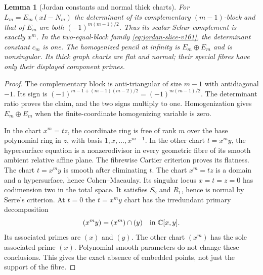 \documentclass[11pt,reqno]{amsart}
\numberwithin{equation}{section}
\newtheorem{lemma}[theorem]{Lemma}
\theoremstyle{definition}\newtheorem{definition}[theorem]{Definition}
\theoremstyle{remark}\newtheorem{remark}[theorem]{Remark}
\newcommand{\C}{\mathbb C}\newcommand{\Q}{\mathbb Q}
\begin{document}
\begin{lemma}[Jordan constants and normal thick charts]
\label{lem:Jordan-details-v162}
For $L_m=E_m(xI-N_m)$ the determinant of its complementary
$(m-1)$-block and that of $E_m$ are both
$(-1)^{m(m-1)/2}$. Thus its scalar Schur complement is exactly
$x^m$. In the two-equal-block family
\eqref{eq:jordan-slice-v161}, the determinant constant $c_m$ is one.
The homogenized pencil at infinity is $E_m\oplus E_m$ and is
nonsingular. Its thick graph charts are flat and normal; their
special fibres have only their displayed component primes.
\end{lemma}
\begin{proof}
The complementary block is anti-triangular of size $m-1$ with
antidiagonal $-1$. Its sign is
$(-1)^{m-1+(m-1)(m-2)/2}=(-1)^{m(m-1)/2}$. The determinant
ratio proves the claim, and the two signs multiply to one.
Homogenization gives $E_m\oplus E_m$ when the finite-coordinate
homogenizing variable is zero.

In the chart $x^m=tz$, the coordinate ring is free of rank $m$
over the base polynomial ring in $z$, with basis
$1,x,\ldots,x^{m-1}$. In the other chart $t=x^my$, the
hypersurface equation is a nonzerodivisor in every geometric fibre
of its smooth ambient relative affine plane. The fibrewise Cartier
criterion \cite[Tag~062Y, part~(3)]{Stacks162} proves its flatness. The chart
$t=x^my$ is smooth after eliminating $t$. The chart $x^m=tz$ is a
domain and a hypersurface, hence Cohen--Macaulay. Its singular locus
$x=t=z=0$ has codimension two in the total space. It satisfies
$S_2$ and $R_1$, hence is normal by Serre's criterion. At $t=0$
the $t=x^my$ chart has the irredundant primary decomposition
\[
                 (x^my)=(x^m)\cap(y)
                     \quad\hbox{in }\C[x,y].
\]
Its associated primes are $(x)$ and $(y)$. The other chart
$(x^m)$ has the sole associated prime $(x)$. Polynomial smooth
parameters do not change these conclusions. This gives the exact
absence of embedded points, not just the support of the fibre.
\end{proof}
\end{document}
